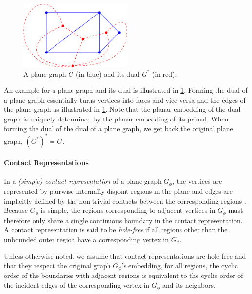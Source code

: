 \begin{figure}[H]
	\centering\includegraphics[height=130px]{Resources/Preliminaries-Dual.pdf}
	\caption{A plane graph $G$ (in blue) and its dual $G^*$ (in red).}
	\label{fig:preliminaries-dual}
\end{figure}

An example for a plane graph and its dual is illustrated in \cref{fig:preliminaries-dual}.
Forming the dual of a plane graph essentially turns vertices into faces and vice versa and  the edges of the plane graph as illustrated in \cref{fig:preliminaries-dual}.
Note that the planar embedding of the dual graph is uniquely determined by the planar embedding of its primal.
When forming the dual of the dual of a plane graph, we get back the original plane graph, \ie{} $(G^*)^* = G$.



\paragraph{Contact Representations}

In a \emph{(simple) contact representation} of a plane graph $G_\phi$, the vertices are represented by pairwise internally disjoint regions in the plane and edges are implicitly defined by the non-trivial contacts between the corresponding regions \cite{alam2013linear}.
Because $G_\phi$ is simple, the regions corresponding to adjacent vertices in $G_\phi$ must therefore only share a single continuous boundary in the contact representation.
A contact representation is said to be \emph{hole-free} if all regions other than the unbounded outer region have a corresponding vertex in $G_\phi$.

Unless otherwise noted, we assume that contact representations are hole-free and that they respect the original graph $G_\phi$'s embedding, \ie{} for all regions, the cyclic order of the boundaries with adjacent regions is equivalent to the cyclic order of the incident edges of the corresponding vertex in $G_\phi$ and its neighbors.


